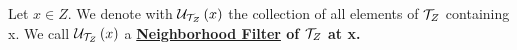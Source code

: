 \label{def:NeighborhoodFilter}   
\newcommand{\NeighborhoodFilter}[0]{
    \bf \hyperref[def:NeighborhoodFilter]{Neighborhood Filter} \rm
}
\newcommand{\NbhFilter}[2]{
    \scU_{#1}\pa{#2}
}
\begin{df}
    Let $x \in Z$. 
    We denote with $\NbhFilter{\Topology{Z}{\T}}{x}$ the collection of all elements of $\mathcal{T}_Z$ containing x. 
    We call $\NbhFilter{\Topology{Z}{\T}}{x}$ a \NeighborhoodFilter  of $\mathcal{T}_Z$ at x. 
\end{df}

